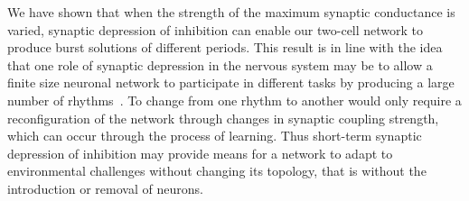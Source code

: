 \documentclass[../manuscript.tex]{subfiles}
\begin{document}
We have shown that when the strength of the maximum synaptic conductance is varied, synaptic depression of inhibition can enable our two-cell network to produce burst solutions of different periods.
This result is in line with the idea that one role of synaptic depression in the nervous system may be to allow a finite size neuronal network to participate in different tasks by producing a large number of rhythms~\citep{bose2011, jalil2004, li2007}.
To change from one rhythm to another would only require a reconfiguration of the network through changes in synaptic coupling strength, which can occur through the process of learning.
Thus short-term synaptic depression of inhibition may provide means for a network to adapt to environmental challenges without changing its topology, that is without the introduction or removal of neurons.
\end{document}
